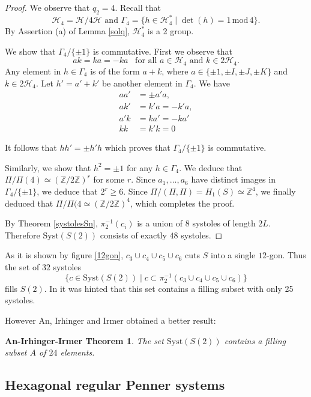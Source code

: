 \documentclass[12pt]{amsart}
\newcommand{\Z}{\mathbb{Z}}
\newcommand{\Syst}{{\mathrm {Syst}}}
\renewcommand{\mod}{\,\mathrm{mod}\,}
\newtheorem{AII}[lemma]{An-Irhinger-Irmer Theorem}
\newcommand{\cH}{\mathcal{H}}
\begin{document}
\begin{proof} We observe that $q_2=4$. Recall that 
$$\cH_4=\cH/4\cH \text{ and }\Gamma_4=\{h\in \cH_4^*\mid \det(h)=1 \mod 4\}.$$
By Assertion (a) of Lemma \ref{solq}, $\cH_4^*$ is a 2 group.

We show that $\Gamma_4/\{\pm 1\}$ is commutative. First we observe
that 
$$ak=ka=-ka\, \,\,\text{ for all } a\in \cH_4 \text{ and } k\in 2 \cH_4.$$
Any element in $h\in \Gamma_4$ is of the form $a+k$, where
$a\in \{\pm 1, \pm I, \pm J, \pm K\}$ and $k\in  2 \cH_4$.
Let $h'=a'+k'$ be another element in $\Gamma_4$.
We have 
\begin{align*} aa'&=\pm a'a,\\
ak'&=k'a =-k'a, \\
a'k&=ka'=-ka'\\
kk&=k'k=0
\end{align*}

 It follows that $hh'=\pm h'h$ which 
proves that
$\Gamma_4/\{\pm 1\}$ is commutative.

Similarly, we show that $h^2=\pm 1$ for any $h\in \Gamma_4$.
We deduce that $\Pi/\Pi(4)\simeq (\Z/2\Z)^r$ for some $r$.
Since $a_1,\ldots, a_6$ have distinct images in
$\Gamma_4/\{\pm 1\}$, we deduce that $2^r\geq 6$. Since
$\Pi/(\Pi,\Pi)= H_1(S)\simeq \Z^4$, we finally deduced that
$\Pi/\Pi(4\simeq (\Z/2\Z)^4$, which completes the proof.



By Theorem \ref{systolesSn}, $\pi_2^{-1}(c_i)$ is a union of $8$ systoles of length $2L$. Therefore $\Syst(S(2))$ consists of exactly $48$ systoles. \end{proof}

\bigskip
As it is shown by figure \ref{12gon},  $c_3\cup c_4\cup c_5\cup c_6$ cuts $S$ into
a single $12$-gon. Thus the set of $32$ systoles
$$\{ c\in \Syst(S(2))\mid c\subset
\pi_2^{-1}(c_3\cup c_4\cup c_5\cup c_6)\}$$ 
fills $S(2)$.  In \cite{Mathieu} it was hinted that this set contains a filling subset with only 25 systoles. 

However An, Irhinger and Irmer obtained a better result:

\begin{AII}\cite{AII}\label{AIIthm} The set $\Syst(S(2))$ contains a filling subset $A$ of $24$ elements.
\end{AII}


\subsection{Hexagonal regular Penner systems}
\end{document}
